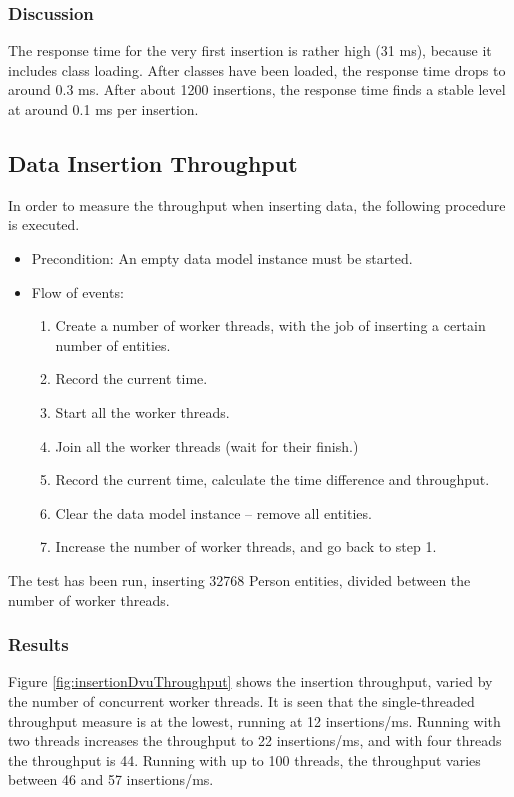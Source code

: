 \subsubsection{Discussion}

The response time for the very first insertion is rather high (31
ms), because it includes class loading. After classes have been loaded,
the response time drops to around 0.3 ms. After about 1200 insertions,
the response time finds a stable level at around 0.1 ms per insertion.


\subsection{Data Insertion Throughput}

In order to measure the throughput when inserting data, the following
procedure is executed.
\begin{itemize}
\item Precondition: An empty data model instance must be started.
\item Flow of events:

\begin{enumerate}
\item Create a number of worker threads, with the job of inserting a certain
number of entities.
\item Record the current time.
\item Start all the worker threads.
\item Join all the worker threads (wait for their finish.)
\item Record the current time, calculate the time difference and throughput.
\item Clear the data model instance -- remove all entities.
\item Increase the number of worker threads, and go back to step 1.
\end{enumerate}
\end{itemize}
The test has been run, inserting 32768 Person entities, divided between
the number of worker threads. 


\subsubsection{Results}

Figure \ref{fig:insertionDvuThroughput} shows the insertion throughput,
varied by the number of concurrent worker threads. It is seen that
the single-threaded throughput measure is at the lowest, running at
12 insertions/ms. Running with two threads increases the throughput
to 22 insertions/ms, and with four threads the throughput is 44. Running
with up to 100 threads, the throughput varies between 46 and 57 insertions/ms.

